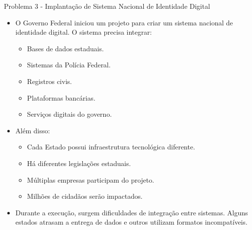 \documentclass{beamer}
\begin{document}
\begin{frame}{Problema 3 - Implantação de Sistema Nacional de Identidade Digital}
	\begin{itemize}
		\justifying
		\item O Governo Federal iniciou um projeto para criar um sistema nacional de identidade digital. O sistema precisa integrar:
			\begin{itemize}
				\item Bases de dados estaduais.
				\item Sistemas da Polícia Federal.
				\item Registros civis.
				\item Plataformas bancárias.
				\item Serviços digitais do governo.
			\end{itemize}
		\item Além disso:
			\begin{itemize}
				\justifying
				\item Cada Estado possui infraestrutura tecnológica diferente.
				\item Há diferentes legislações estaduais.
				\item Múltiplas empresas participam do projeto.
				\item Milhões de cidadãos serão impactados.
			\end{itemize}
		\item Durante a execução, surgem dificuldades de integração entre sistemas. Alguns estados atrasam a entrega de dados e outros utilizam formatos incompatíveis.
	\end{itemize}
\end{frame}
\end{document}

